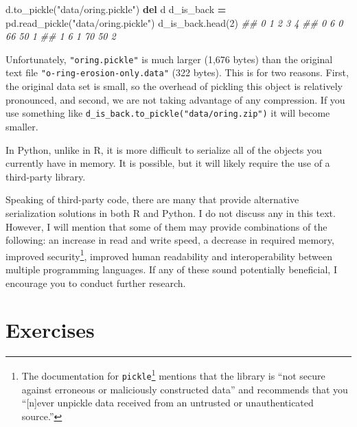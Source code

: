 \documentclass[
  12pt,
  krantz2]{krantz}
\makeatletter
\newenvironment{Shaded}{\begin{snugshade}}{\end{snugshade}}
\newcommand{\CommentTok}[1]{\textcolor[rgb]{0.37,0.37,0.37}{\textit{#1}}}
\newcommand{\DecValTok}[1]{\textcolor[rgb]{0.06,0.06,0.06}{#1}}
\newcommand{\KeywordTok}[1]{\textcolor[rgb]{0.27,0.27,0.27}{\textbf{#1}}}
\newcommand{\NormalTok}[1]{#1}
\newcommand{\OperatorTok}[1]{\textcolor[rgb]{0.43,0.43,0.43}{\textbf{#1}}}
\newcommand{\StringTok}[1]{\textcolor[rgb]{0.5,0.5,0.5}{#1}}
\renewcommand{\href}[2]{#2\footnote{\url{#1}}}
\newenvironment{kframe}{%
\medskip{}
\setlength{\fboxsep}{.8em}
 \def\at@end@of@kframe{}%
 \ifinner\ifhmode%
  \def\at@end@of@kframe{\end{minipage}}%
  \begin{minipage}{\columnwidth}%
 \fi\fi%
 \def\FrameCommand##1{\hskip\@totalleftmargin \hskip-\fboxsep
 \colorbox{shadecolor}{##1}\hskip-\fboxsep
     \hskip-\linewidth \hskip-\@totalleftmargin \hskip\columnwidth}%
 \MakeFramed {\advance\hsize-\width
   \@totalleftmargin\z@ \linewidth\hsize
   \@setminipage}}%
 {\par\unskip\endMakeFramed%
 \at@end@of@kframe}
\renewenvironment{Shaded}{\begin{kframe}}{\end{kframe}}
\makeatother
\begin{document}
\begin{Shaded}
\begin{Highlighting}[]
\NormalTok{d.to\_pickle(}\StringTok{"data/oring.pickle"}\NormalTok{)}
\KeywordTok{del}\NormalTok{ d}
\NormalTok{d\_is\_back }\OperatorTok{=}\NormalTok{ pd.read\_pickle(}\StringTok{"data/oring.pickle"}\NormalTok{)}
\NormalTok{d\_is\_back.head(}\DecValTok{2}\NormalTok{)}
\CommentTok{\#\#    0  1   2   3  4}
\CommentTok{\#\# 0  6  0  66  50  1}
\CommentTok{\#\# 1  6  1  70  50  2}
\end{Highlighting}
\end{Shaded}

\begin{rmd-caution}
Unfortunately, \texttt{"oring.pickle"} is much larger (1,676 bytes) than the original text file \texttt{"o-ring-erosion-only.data"} (322 bytes). This is for two reasons. First, the original data set is small, so the overhead of pickling this object is relatively pronounced, and second, we are not taking advantage of any compression. If you use something like \texttt{d\_is\_back.to\_pickle("data/oring.zip")} it will become smaller.

\end{rmd-caution}

In Python, unlike in R, it is more difficult to serialize all of the objects you currently have in memory. It is possible, but it will likely require the use of a third-party library.

Speaking of third-party code, there are many that provide alternative serialization solutions in both R and Python. I do not discuss any in this text. However, I will mention that some of them may provide combinations of the following: an increase in read and write speed, a decrease in required memory, improved security\footnote{The \href{https://docs.python.org/2/library/pickle.html}{documentation for \texttt{pickle}} mentions that the library is ``not secure against erroneous or maliciously constructed data'' and recommends that you ``{[}n{]}ever unpickle data received from an untrusted or unauthenticated source.''}, improved human readability and interoperability between multiple programming languages. If any of these sound potentially beneficial, I encourage you to conduct further research.

\hypertarget{exercises-7}{%
\section{Exercises}\label{exercises-7}}
\end{document}
